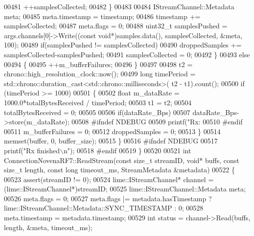 \begin{DoxyCode}
{{{{{{{{{{{00481                 ++samplesCollected;
00482             \}
00483 
00484             IStreamChannel::Metadata meta;
00485             meta.timestamp = timestamp;
00486             timestamp += samplesCollected;
00487             meta.flags = 0;
00488             uint32\_t samplesPushed = args.channels[0]->Write((\textcolor{keyword}{const} \textcolor{keywordtype}{void}*)samples.data(), samplesCollected,
       &meta, 100);
00489             \textcolor{keywordflow}{if}(samplesPushed != samplesCollected)
00490                 droppedSamples += samplesCollected-samplesPushed;
00491             samplesCollected = 0;
00492         \}
00493         \textcolor{keywordflow}{else}
00494         \{
00495             ++m\_bufferFailures;
00496         \}
00497 
00498         t2 = chrono::high\_resolution\_clock::now();
00499         \textcolor{keywordtype}{long} timePeriod = std::chrono::duration\_cast<std::chrono::milliseconds>(
      t2 - t1).count();
00500         \textcolor{keywordflow}{if} (timePeriod >= 1000)
00501         \{
00502             \textcolor{keywordtype}{float} m\_dataRate = 1000.0*totalBytesReceived / timePeriod;
00503             t1 = t2;
00504             totalBytesReceived = 0;
00505 
00506             \textcolor{keywordflow}{if}(dataRate\_Bps)
00507                 dataRate\_Bps->store(m\_dataRate);
00508 \textcolor{preprocessor}{#ifndef NDEBUG}
00509             printf(\textcolor{stringliteral}{"Rx: %
00510 \textcolor{preprocessor}{#endif}
00511             m\_bufferFailures = 0;
00512             droppedSamples = 0;
00513         \}
00514         memset(buffer, 0, buffer\_size);
00515     \}
00516 \textcolor{preprocessor}{#ifndef NDEBUG}
00517     printf(\textcolor{stringliteral}{"Rx finished\(\backslash\)n"});
00518 \textcolor{preprocessor}{#endif}
00519 \}
00520 
00521 \textcolor{keywordtype}{int} ConnectionNovenaRF7::ReadStream(\textcolor{keyword}{const} \textcolor{keywordtype}{size\_t} streamID, \textcolor{keywordtype}{void}* buffs, \textcolor{keyword}{const} \textcolor{keywordtype}{size\_t} 
      length, \textcolor{keyword}{const} \textcolor{keywordtype}{long} timeout_ms, StreamMetadata &metadata)
00522 \{
00523     assert(streamID != 0);
00524     lime::IStreamChannel* channel = (lime::IStreamChannel*)streamID;
00525     lime::IStreamChannel::Metadata meta;
00526     meta.flags = 0;
00527     meta.flags |= metadata.hasTimestamp ? lime::IStreamChannel::Metadata::SYNC\_TIMESTAMP : 0;
00528     meta.timestamp = metadata.timestamp;
00529     \textcolor{keywordtype}{int} status = channel->Read(buffs, length, &meta, timeout\_ms);
}}}}}}}}}}}}
\end{DoxyCode}
